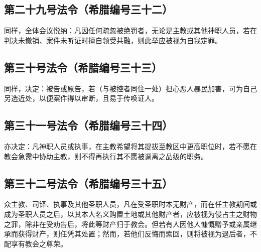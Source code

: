 \subsection{第二十九号法令（希腊编号三十二）}

\par

同样，全体会议悦纳：凡因任何疏忽被绝罚者，无论是主教或其他神职人员，若在判决未撤销、案件未听证时擅自领受共融，则此举应被视为自我定罪。\par


\subsection{第三十号法令（希腊编号三十三）}

\par

同样，决定：被告或原告，若（与被控者同住一处）担心恶人暴民加害，可为自己另选近处，以便案件得以审断，且易于传唤证人。\par


\subsection{第三十一号法令（希腊编号三十四）}

\par

亦决定：凡神职人员或执事，在主教希望将其提拔至教区中更高职位时，若不愿在教会急需中协助主教，则不得再执行其不愿被调离之品级的职务。\par


\subsection{第三十二号法令（希腊编号三十五）}

\par

众主教、司铎、执事及其他圣职人员，凡在受圣职时本无财产，而在任主教期间或成为圣职人员之后，以其本人名义购置土地或其他财产者，应被视为侵占主之财物之罪，除非在受劝告后，将此等财产归于教会。但若有人因他人慷慨赠予或亲属继承而获得财产，则任凭其处置；然而，若他们反悔而索回，则将被视为退后者，不配享有教会之尊荣。\par

